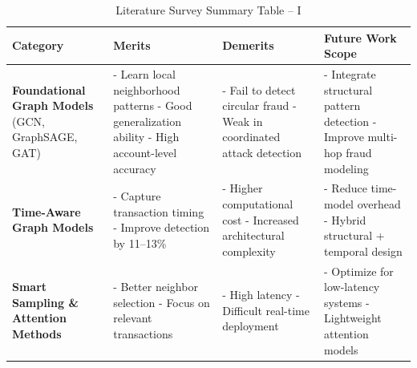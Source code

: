 \documentclass[11pt, a4paper]{article}
\begin{document}
\begin{table}[H]
    \centering
    \footnotesize
    \renewcommand{\arraystretch}{1.20}
    \begin{tabular}{|p{3.2cm}|p{3.8cm}|p{3.8cm}|p{4.2cm}|}
        \hline
        \textbf{Category} & \textbf{Merits} & \textbf{Demerits} & \textbf{Future Work Scope} \\
        \hline
        \textbf{Foundational Graph Models} (GCN, GraphSAGE, GAT) \cite{kipf2017semi, hamilton2017inductive, velickovic2018graph} &
        - Learn local neighborhood patterns \newline
        - Good generalization ability \newline
        - High account-level accuracy &
        - Fail to detect circular fraud \newline
        - Weak in coordinated attack detection &
        - Integrate structural pattern detection \newline
        - Improve multi-hop fraud modeling \\
        \hline
        \textbf{Time-Aware Graph Models} \cite{weber2019anti, kim2024temporal} &
        - Capture transaction timing \newline
        - Improve detection by 11--13\% &
        - Higher computational cost \newline
        - Increased architectural complexity &
        - Reduce time-model overhead \newline
        - Hybrid structural + temporal design \\
        \hline
        \textbf{Smart Sampling \& Attention Methods} \cite{tian2023transaction, kumar2024graphsage} &
        - Better neighbor selection \newline
        - Focus on relevant transactions &
        - High latency \newline
        - Difficult real-time deployment &
        - Optimize for low-latency systems \newline
        - Lightweight attention models \\
        \hline
    \end{tabular}
    \caption{Literature Survey Summary Table -- I}
    \label{tab:lit_survey_1}
\end{table}
\end{document}
